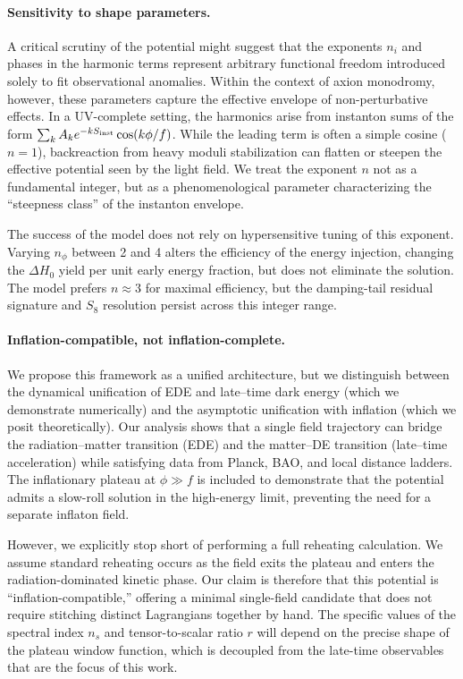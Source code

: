 \documentclass[a4paper,11pt]{article}
\begin{document}
\paragraph{Sensitivity to shape parameters.}
A critical scrutiny of the potential might suggest that the exponents $n_i$ and phases in the harmonic terms represent arbitrary functional freedom introduced solely to fit observational anomalies. Within the context of axion monodromy, however, these parameters capture the effective envelope of non-perturbative effects. In a UV-complete setting, the harmonics arise from instanton sums of the form $\sum_k A_k e^{-k S_{\rm inst}} \cos(k\phi/f)$. While the leading term is often a simple cosine ($n=1$), backreaction from heavy moduli stabilization can flatten or steepen the effective potential seen by the light field. We treat the exponent $n$ not as a fundamental integer, but as a phenomenological parameter characterizing the ``steepness class'' of the instanton envelope.

The success of the model does not rely on hypersensitive tuning of this exponent. Varying $n_\phi$ between 2 and 4 alters the efficiency of the energy injection, changing the $\Delta H_0$ yield per unit early energy fraction, but does not eliminate the solution. The model prefers $n \approx 3$ for maximal efficiency, but the damping-tail residual signature and $S_8$ resolution persist across this integer range.

\paragraph{Inflation-compatible, not inflation-complete.}
We propose this framework as a unified architecture, but we distinguish between the dynamical unification of EDE and late--time dark energy (which we demonstrate numerically) and the asymptotic unification with inflation (which we posit theoretically). Our analysis shows that a single field trajectory can bridge the radiation--matter transition (EDE) and the matter--DE transition (late--time acceleration) while satisfying data from Planck, BAO, and local distance ladders. The inflationary plateau at $\phi \gg f$ is included to demonstrate that the potential admits a slow-roll solution in the high-energy limit, preventing the need for a separate inflaton field.

However, we explicitly stop short of performing a full reheating calculation. We assume standard reheating occurs as the field exits the plateau and enters the radiation-dominated kinetic phase. Our claim is therefore that this potential is ``inflation-compatible,'' offering a minimal single-field candidate that does not require stitching distinct Lagrangians together by hand. The specific values of the spectral index $n_s$ and tensor-to-scalar ratio $r$ will depend on the precise shape of the plateau window function, which is decoupled from the late-time observables that are the focus of this work.
\end{document}
